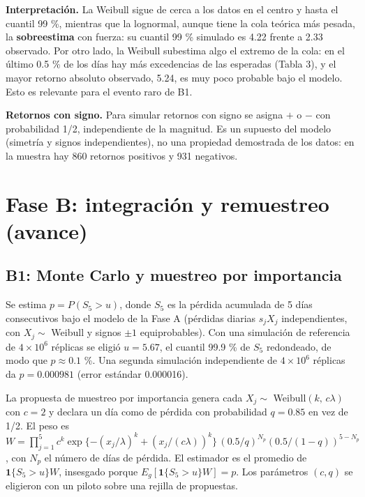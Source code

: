 \documentclass[
  spanish,
]{article}
\begin{document}
\textbf{Interpretación.} La Weibull sigue de cerca a los datos en el
centro y hasta el cuantil 99 \%, mientras que la lognormal, aunque tiene
la cola teórica más pesada, la \textbf{sobreestima} con fuerza: su
cuantil 99 \% simulado es 4.22 frente a 2.33 observado. Por otro lado,
la Weibull subestima algo el extremo de la cola: en el último 0.5 \% de
los días hay más excedencias de las esperadas (Tabla 3), y el mayor
retorno absoluto observado, 5.24, es muy poco probable bajo el modelo.
Esto es relevante para el evento raro de B1.

\textbf{Retornos con signo.} Para simular retornos con signo se asigna
\(+\) o \(-\) con probabilidad 1/2, independiente de la magnitud. Es un
supuesto del modelo (simetría y signos independientes), no una propiedad
demostrada de los datos: en la muestra hay 860 retornos positivos y 931
negativos.

\section{Fase B: integración y remuestreo
(avance)}\label{fase-b-integraciuxf3n-y-remuestreo-avance}

\subsection{B1: Monte Carlo y muestreo por
importancia}\label{b1-monte-carlo-y-muestreo-por-importancia}

Se estima \(p=P(S_5>u)\), donde \(S_5\) es la pérdida acumulada de 5
días consecutivos bajo el modelo de la Fase A (pérdidas diarias
\(s_jX_j\) independientes, con \(X_j\sim\) Weibull y signos \(\pm1\)
equiprobables). Con una simulación de referencia de \(4\times10^6\)
réplicas se eligió \(u=5.67\), el cuantil 99.9 \% de \(S_5\) redondeado,
de modo que \(p\approx0.1\) \%. Una segunda simulación independiente de
\(4\times10^6\) réplicas da \(p=0.000981\) (error estándar 0.000016).

La propuesta de muestreo por importancia genera cada \(X_j\sim\)
Weibull\((k,\,c\lambda)\) con \(c=2\) y declara un día como de pérdida
con probabilidad \(q=0.85\) en vez de 1/2. El peso es
\(W=\prod_{j=1}^5 c^{k}\exp\{-(x_j/\lambda)^k+(x_j/(c\lambda))^k\}\,(0.5/q)^{N_p}(0.5/(1-q))^{5-N_p}\),
con \(N_p\) el número de días de pérdida. El estimador es el promedio de
\(\mathbf 1\{S_5>u\}W\), insesgado porque
\(E_g[\mathbf 1\{S_5>u\}W]=p\). Los parámetros \((c,q)\) se eligieron
con un piloto sobre una rejilla de propuestas.
\end{document}
